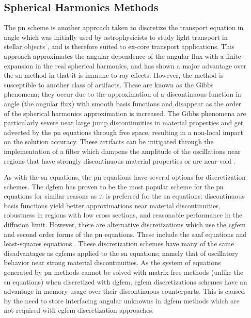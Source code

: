 \subsection{Spherical Harmonics Methods}
\label{lit_review:radiation_transport:p_n}

The \acrfull{pn} scheme is another approach taken to discretize the transport equation in angle which was initially used by astrophysicists to study light transport in stellar objects \cite{applied_reactor_physics}, and is therefore suited to ex-core transport applications. This approach approximates the angular dependence of the angular flux with a finite expansion in the real spherical harmonics, and has shown a major advantage over the \acrshort{sn} method in that it is immune to ray effects. However, the method is susceptible to another class of artifacts. These are known as the Gibbs phenomena; they occur due to the approximation of a discontinuous function in angle (the angular flux) with smooth basis functions \cite{pn_2,pn_3} and disappear as the order of the spherical harmonics approximation is increased. The Gibbs phenomena are particularly severe near large jump discontinuities in material properties and get advected by the \acrshort{pn} equations through free space, resulting in a non-local impact on the solution accuracy. These artifacts can be mitigated through the implementation of a filter which dampens the amplitude of the oscillations near regions that have strongly discontinuous material properties or are near-void \cite{pn_1,pn_2,pn_3}.

As with the \acrshort{sn} equations, the \acrshort{pn} equations have several options for discretization schemes. The \acrshort{dgfem} has proven to be the most popular scheme for the \acrshort{pn} equations \cite{pn_2,dgfem_pn_1,laboure_pn_discretization} for similar reasons as it is preferred for the \acrshort{sn} equations: discontinuous basis functions yield better approximations near material discontinuities, robustness in regions with low cross sections, and reasonable performance in the diffusion limit. However, there are alternative discretizations which use the \acrshort{cgfem} and second order forms of the \acrshort{pn} equations. These include the \acrshort{saaf} equations \cite{cgfem_saaf_1,laboure_pn_discretization} and least-squares equations \cite{laboure_pn_discretization,cgfem_ls_saaf_pn}. These discretization schemes have many of the same disadvantages as \acrshort{cgfem}s applied to the \acrshort{sn} equations; namely that of oscillatory behavior near strong material discontinuities. As the system of equations generated by \acrshort{pn} methods cannot be solved with matrix free methods (unlike the \acrshort{sn} equations) when discretized with \acrshort{dgfem}, \acrshort{cgfem} discretizations schemes have an advantage in memory usage over their discontinuous counterparts. This is caused by the need to store interfacing angular unknowns in \acrshort{dgfem} methods which are not required with \acrshort{cgfem} discretization approaches.  

